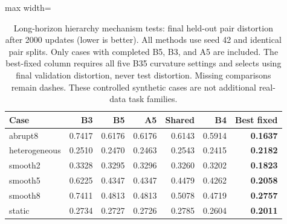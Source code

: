 \begin{table}[t]
\centering
\footnotesize\setlength{\tabcolsep}{4.2pt}\renewcommand{\arraystretch}{1.12}
\caption{Long-horizon hierarchy mechanism tests: final held-out pair distortion after 2000 updates (lower is better). All methods use seed 42 and identical pair splits. Only cases with completed B5, B3, and A5 are included. The best-fixed column requires all five B35 curvature settings and selects using final validation distortion, never test distortion. Missing comparisons remain dashes. These controlled synthetic cases are not additional real-data task families.}
\label{tab:revision-mechanism}
\begin{adjustbox}{max width=\linewidth}
\begin{tabular}{lrrrrrr}
\toprule
Case & B3 & B5 & A5 & Shared & B4 & Best fixed \\
\midrule
abrupt8 & 0.7417 & \cellcolor{oursbg}0.6176 & 0.6176 & 0.6143 & 0.5914 & \textbf{0.1637} \\
heterogeneous & 0.2510 & \cellcolor{oursbg}0.2470 & 0.2463 & 0.2543 & 0.2415 & \textbf{0.2182} \\
smooth2 & 0.3328 & \cellcolor{oursbg}0.3295 & 0.3296 & 0.3260 & 0.3202 & \textbf{0.1823} \\
smooth5 & 0.6225 & \cellcolor{oursbg}0.4347 & 0.4347 & 0.4479 & 0.4262 & \textbf{0.2058} \\
smooth8 & 0.7411 & \cellcolor{oursbg}0.4813 & 0.4813 & 0.5078 & 0.4719 & \textbf{0.2757} \\
static & 0.2734 & \cellcolor{oursbg}0.2727 & 0.2726 & 0.2785 & 0.2604 & \textbf{0.2011} \\
\bottomrule
\end{tabular}
\end{adjustbox}
\end{table}
